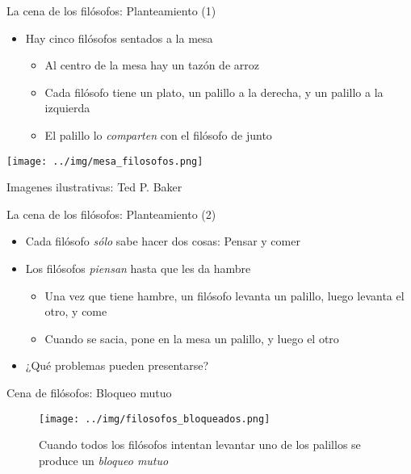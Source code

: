 \documentclass[presentation]{beamer}
\begin{document}
\begin{frame}[label={sec:org4cbb3e7}]{La cena de los filósofos: Planteamiento (1)}
\begin{itemize}
\item Hay cinco filósofos sentados a la mesa
\begin{itemize}
\item Al centro de la mesa hay un tazón de arroz
\item Cada filósofo tiene un plato, un palillo a la derecha, y un
palillo a la izquierda
\item El palillo lo \emph{comparten} con el filósofo de junto
\end{itemize}
\end{itemize}
\begin{center}
\begin{center}
\texttt{[image: ../img/mesa\_filosofos.png]}
\end{center}
\end{center}
{\scriptsize Imagenes ilustrativas: Ted P. Baker}
\end{frame}

\begin{frame}[label={sec:org45edd03}]{La cena de los filósofos: Planteamiento (2)}
\begin{itemize}
\item Cada filósofo \emph{sólo} sabe hacer dos cosas: Pensar y comer
\item Los filósofos \emph{piensan} hasta que les da hambre
\begin{itemize}
\item Una vez que tiene hambre, un filósofo levanta un palillo, luego
levanta el otro, y come
\item Cuando se sacia, pone en la mesa un palillo, y luego el otro
\end{itemize}
\item ¿Qué problemas pueden presentarse?
\end{itemize}
\end{frame}

\begin{frame}[label={sec:org0221fcf}]{Cena de filósofos: Bloqueo mutuo}
\begin{center}
\begin{figure}[htbp]
\centering
\texttt{[image: ../img/filosofos\_bloqueados.png]}
\caption{Cuando todos los filósofos intentan levantar uno de los palillos se produce un \emph{bloqueo mutuo}}
\end{figure}
\end{center}
\end{frame}
\end{document}
